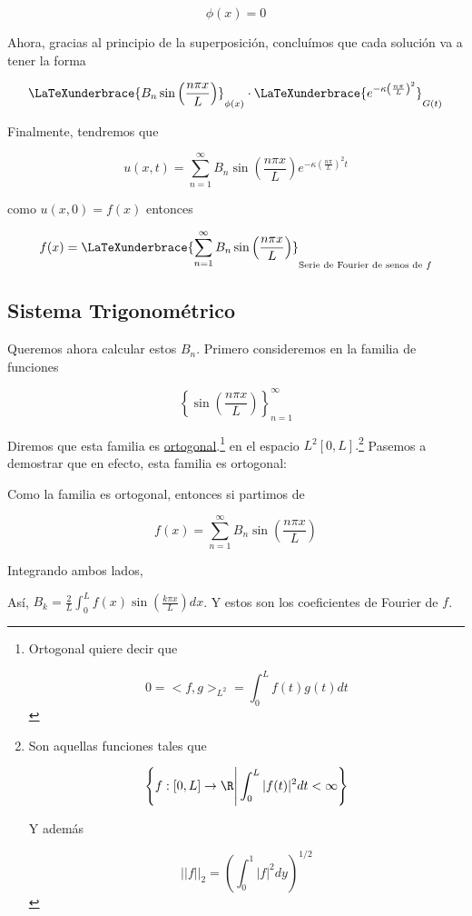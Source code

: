 \[
    \phi(x) = 0
\]

Ahora, gracias al principio de la superposición, concluímos que cada solución va a tener la forma

\[
    \LaTeXunderbrace{B_n\sin\left( \frac{n\pi x}{L} \right)}_{\phi(x)} \cdot \LaTeXunderbrace{\vphantom{\left( \frac{n\pi x}{L} \right)}e^{-\kappa \left( \frac{n\pi}{L} \right)^2 }}_{G(t)}
\]

Finalmente, tendremos que

\[
    u(x,t) = \sum_{n = 1}^{\infty} B_n\sin\left( \frac{n\pi x}{L} \right) e^{-\kappa \left( \frac{n\pi}{L} \right)^2 t}
\]

\noindent
como $u(x,0) = f(x)$ entonces

\[
    f(x) = \LaTeXunderbrace{\sum_{n = 1}^{\infty} B_n\sin\left( \frac{n\pi x}{L} \right)}_{\text{Serie de Fourier de senos de $f$}}
\]

\subsection{Sistema Trigonométrico}

Queremos ahora calcular estos $B_n$. Primero consideremos en la familia de funciones

\[
    \left\{ \sin\left( \frac{n\pi x}{L} \right) \right\}^{\infty}_{n = 1}
\]

Diremos que esta familia es  \ul{ortogonal}.\footnote{Ortogonal quiere decir que

\[
    0 = <f, g>_{L^2} = \int_0^L f(t)g(t)dt
\]} en el espacio $L^2[0, L].$\footnote{Son aquellas funciones tales que

\[
    \left\{ f: [0, L] \rightarrow \R \Bigg| \int_0^L |f(t)|^2 dt < \infty \right\}
\]

Y además

\[
    ||f||_2 = \left( \int_0^1 |f|^2 dy \right)^{1/2}
\]} Pasemos a demostrar que en efecto, esta familia es ortogonal:


Como la familia es ortogonal, entonces si partimos de

\[
    f(x) = \sum_{n = 1}^{\infty} B_n\sin\left( \frac{n\pi x}{L} \right)
\]

Integrando ambos lados,


Así, $B_k = \frac{2}{L} \int_0^L f(x) \sin(\frac{k\pi x}{L}) dx$. Y estos son los coeficientes de Fourier de $f$.











